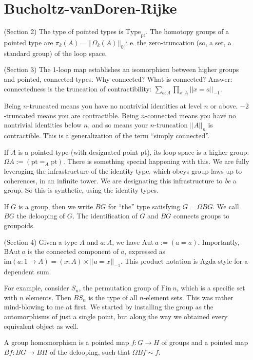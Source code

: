 \documentclass[12pt]{article}
\newcommand{\pt}{\mathrm{pt}}
\newcommand{\Aut}{\mathrm{Aut}}
\newcommand{\BAut}{\mathrm{BAut}}
\newcommand{\im}{\mathrm{im}}
\newcommand{\Fin}{\mathrm{Fin}}
\begin{document}
\section{Bucholtz-vanDoren-Rijke}
(Section 2) The type of pointed types is $\mathrm{Type}_\mathrm{pt}$. The homotopy groups of a pointed type are $\pi_k(A) = ||{\Omega_k(A)}||_0$ i.e. the zero-truncation (so, a set, a standard group) of the loop space.

(Section 3) The 1-loop map establishes an isomorphism between higher groups and pointed, connected types. Why connected? What is connected? Answer: connectedness is the truncation of contractibility: $\sum_{a:A}\prod_{x:A}||x=a||_{-1}$.

Being $n$-truncated means you have no nontrivial identities at level $n$ or above. $-2$-truncated means you are contractible. Being $n$-connected means you have no nontrivial identities below $n$, and so means your $n$-truncation $||A||_n$ is contractible. This is a generalization of the term ``simply connected''.

If $A$ is a pointed type (with designated point pt), its loop space is a higher group: $\Omega A := (\pt =_A \pt)$. There is something special happening with this. We are fully leveraging the infrastructure of the identity type, which obeys group laws up to coherences, in an infinite tower. We are designating this infrastructure to \emph{be} a group. So this is synthetic, using the identity types.

If $G$ is a group, then we write $BG$ for ``the'' type satisfying $G=\Omega BG$. We call $BG$ the delooping of $G$. The identification of $G$ and $BG$ connects groups to groupoids.

(Section 4) Given a type $A$ and $a : A$, we have $\Aut\ a := (a = a)$. Importantly, $\BAut\ a$ is the connected component of $a$, expressed as $\im(a : 1 \to A) = (x : A) \times ||a = x||_{-1}$. This product notation is Agda style for a dependent sum.

For example, consider $S_n$, the permutation group of $\Fin\ n$, which is a specific set with $n$ elements. Then $BS_n$ is the type of all $n$-element sets. This was rather mind-blowing to me at first. We started by installing the group as the automorphisms of just a single point, but along the way we obtained every equivalent object as well.

A group homomorphism is a pointed map $f: G \to H$ of groups and a pointed map $Bf: BG \to BH$ of the delooping, such that $\Omega Bf \sim f$.
\end{document}
